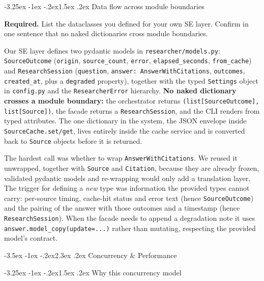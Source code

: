 \documentclass[11pt,a4paper]{article}
\makeatletter
\renewcommand\section{\@startsection{section}{1}{\z@}%
    {-3.5ex \@plus -1ex \@minus -.2ex}{2.3ex \@plus .2ex}%
    {\normalfont\Large\bfseries\color{accent}}}%
\renewcommand\subsection{\@startsection{subsection}{2}{\z@}%
    {-3.25ex \@plus -1ex \@minus -.2ex}{1.5ex \@plus .2ex}%
    {\normalfont\large\bfseries\color{accent}}}%
\makeatother
\begin{document}
\subsection{Data flow across module boundaries}

\begin{deliverbox}
\textbf{Required.} List the dataclasses you defined for your own SE layer. Confirm in one sentence that no naked dictionaries cross module boundaries.
\end{deliverbox}

Our SE layer defines two pydantic models in \texttt{researcher/models.py}: \texttt{SourceOutcome} (\texttt{origin}, \texttt{source\_count}, \texttt{error}, \texttt{elapsed\_seconds}, \texttt{from\_cache}) and \texttt{ResearchSession} (\texttt{question}, \texttt{answer: AnswerWithCitations}, \texttt{outcomes}, \texttt{created\_at}, plus a \texttt{degraded} property), together with the typed \texttt{Settings} object in \texttt{config.py} and the \texttt{ResearcherError} hierarchy. \textbf{No naked dictionary crosses a module boundary:} the orchestrator returns \texttt{(list[SourceOutcome], list[Source])}, the facade returns a \texttt{ResearchSession}, and the CLI renders from typed attributes. The one dictionary in the system, the JSON envelope inside \texttt{SourceCache.set/get}, lives entirely inside the cache service and is converted back to \texttt{Source} objects before it is returned.

The hardest call was whether to wrap \texttt{AnswerWithCitations}. We reused it unwrapped, together with \texttt{Source} and \texttt{Citation}, because they are already frozen, validated pydantic models and re-wrapping would only add a translation layer. The trigger for defining a \emph{new} type was information the provided types cannot carry: per-source timing, cache-hit status and error text (hence \texttt{SourceOutcome}) and the pairing of the answer with those outcomes and a timestamp (hence \texttt{ResearchSession}). When the facade needs to append a degradation note it uses \texttt{answer.model\_copy(update=...)} rather than mutating, respecting the provided model's contract.

\section{Concurrency \& Performance}\label{sec:concurrency}

\subsection{Why this concurrency model}
\end{document}
